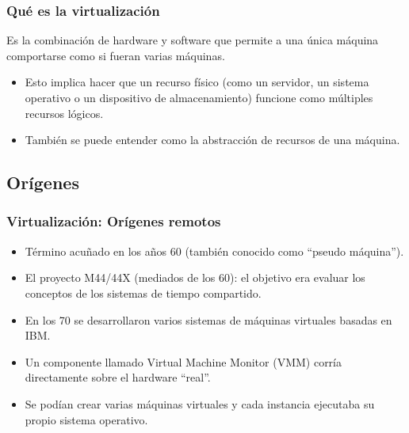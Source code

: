 \documentclass{beamer}
\begin{document}
\begin{frame}
\frametitle{Qué es la virtualización}

\begin{definition}
Es la combinación de hardware y software que permite a una única máquina comportarse como si fueran varias máquinas.
\end{definition}

\begin{itemize}
\item Esto implica hacer que un recurso físico (como un servidor, un sistema operativo o un dispositivo de almacenamiento) funcione como \alert{múltiples recursos lógicos}.
\item También se puede entender como la \alert{abstracción} de recursos de una máquina.
\end{itemize}

\end{frame}


\subsection{Orígenes}

\begin{frame}
\frametitle{Virtualización: Orígenes remotos}

\begin{itemize}
\item Término acuñado en los años 60 (también conocido como ``pseudo máquina'').
\item El proyecto M44/44X (mediados de los 60): el objetivo era evaluar los conceptos de los sistemas de tiempo compartido.
\item En los 70 se desarrollaron varios sistemas de máquinas virtuales basadas en IBM.
\item Un componente llamado \alert{Virtual Machine Monitor (VMM)} corría directamente sobre el hardware ``real''.
\item Se podían crear varias máquinas virtuales y cada instancia ejecutaba su propio sistema operativo.
\end{itemize}

\end{frame}

\end{document}
